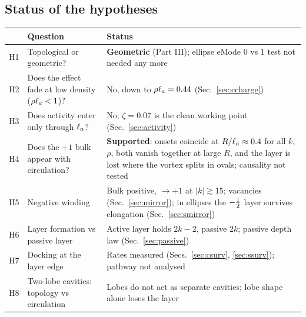 \subsection{Status of the hypotheses}
\begin{table}[H]\centering\small
\begin{tabularx}{\textwidth}{lXX}\toprule
& Question & Status\\\midrule
H1 & Topological or geometric? & \textbf{Geometric} (Part III); ellipse eMode 0 vs 1 test not needed any more\\
H2 & Does the effect fade at low density ($\rho\ell_a<1$)? & No, down to $\rho\ell_a=0.44$ (Sec.~\ref{sec:ccharge})\\
H3 & Does activity enter only through $\ell_a$? & No; $\zeta=0.07$ is the clean working point (Sec.~\ref{sec:activity})\\
H4 & Does the $+1$ bulk appear with circulation? & \textbf{Supported}: onsets coincide at $R/\ell_a\approx0.4$ for all $k$, $\rho$, both vanish together at large $R$, and the layer is lost where the vortex splits in ovals; causality not tested\\
H5 & Negative winding & Bulk positive, $\to+1$ at $|k|\gtrsim15$; vacancies (Sec.~\ref{sec:mirror}); in ellipses the $-\tfrac12$ layer survives elongation (Sec.~\ref{sec:smirror})\\
H6 & Layer formation vs passive layer & Active layer holds $2k-2$, passive $2k$; passive depth law (Sec.~\ref{sec:passive})\\
H7 & Docking at the layer edge & Rates measured (Secs.~\ref{sec:csurv}, \ref{sec:ssurv}); pathway not analysed\\
H8 & Two-lobe cavities: topology vs circulation & Lobes do not act as separate cavities; lobe shape alone loses the layer\\\bottomrule
\end{tabularx}
\end{table}

